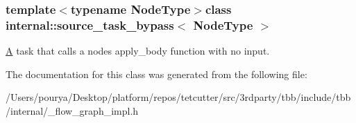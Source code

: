 \subsubsection*{template$<$typename Node\+Type$>$class internal\+::source\+\_\+task\+\_\+bypass$<$ Node\+Type $>$}

\hyperlink{structA}{A} task that calls a node\textquotesingle{}s apply\+\_\+body function with no input. 

The documentation for this class was generated from the following file\+:\begin{DoxyCompactItemize}
\item 
/\+Users/pourya/\+Desktop/platform/repos/tetcutter/src/3rdparty/tbb/include/tbb/internal/\+\_\+flow\+\_\+graph\+\_\+impl.\+h\end{DoxyCompactItemize}
